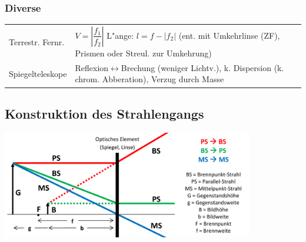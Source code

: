 \subsubsection{Diverse  }
\begin{tabular}{ll}
Terrestr. Fernr. & $V=\left|\dfrac{f_1}{f_2}\right|$ \qquad L"ange: $l=f-|f_2|$ (ent. mit Umkehrlinse (ZF), Prismen oder Streul. zur Umkehrung) \\
Spiegelteleskope & Reflexion$\leftrightarrow$Brechung (weniger Lichtv.), k. Dispersion (k. chrom. Abberation), Verzug durch Masse  \\
\end{tabular}

\subsection{Konstruktion des Strahlengangs}
\begin{center}
	\includegraphics[width=11cm]{./bilder/strahlengang.png}
\end{center}
